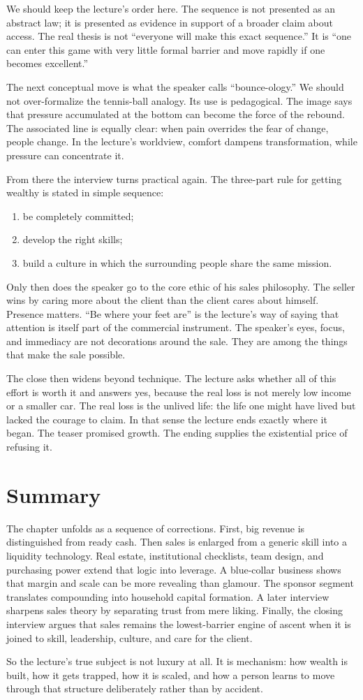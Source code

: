 We should keep the lecture's order here. The sequence is not presented as an abstract law; it is presented as evidence in support of a broader claim about access. The real thesis is not ``everyone will make this exact sequence.'' It is ``one can enter this game with very little formal barrier and move rapidly if one becomes excellent.''

The next conceptual move is what the speaker calls ``bounce-ology.'' We should not over-formalize the tennis-ball analogy. Its use is pedagogical. The image says that pressure accumulated at the bottom can become the force of the rebound. The associated line is equally clear: when pain overrides the fear of change, people change. In the lecture's worldview, comfort dampens transformation, while pressure can concentrate it.

From there the interview turns practical again. The three-part rule for getting wealthy is stated in simple sequence:
\begin{enumerate}
\item be completely committed;
\item develop the right skills;
\item build a culture in which the surrounding people share the same mission.
\end{enumerate}

Only then does the speaker go to the core ethic of his sales philosophy. The seller wins by caring more about the client than the client cares about himself. Presence matters. ``Be where your feet are'' is the lecture's way of saying that attention is itself part of the commercial instrument. The speaker's eyes, focus, and immediacy are not decorations around the sale. They are among the things that make the sale possible.

The close then widens beyond technique. The lecture asks whether all of this effort is worth it and answers yes, because the real loss is not merely low income or a smaller car. The real loss is the unlived life: the life one might have lived but lacked the courage to claim. In that sense the lecture ends exactly where it began. The teaser promised growth. The ending supplies the existential price of refusing it.

\section{Summary}

The chapter unfolds as a sequence of corrections. First, big revenue is distinguished from ready cash. Then sales is enlarged from a generic skill into a liquidity technology. Real estate, institutional checklists, team design, and purchasing power extend that logic into leverage. A blue-collar business shows that margin and scale can be more revealing than glamour. The sponsor segment translates compounding into household capital formation. A later interview sharpens sales theory by separating trust from mere liking. Finally, the closing interview argues that sales remains the lowest-barrier engine of ascent when it is joined to skill, leadership, culture, and care for the client.

So the lecture's true subject is not luxury at all. It is mechanism: how wealth is built, how it gets trapped, how it is scaled, and how a person learns to move through that structure deliberately rather than by accident.